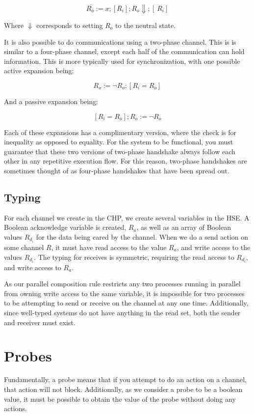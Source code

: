 \documentclass[times, 10pt]{article}
\begin{document}
\[
R_o := x; [R_i]; R_o\!\Downarrow; [~R_i]
\]

Where $\Downarrow$ corresponds to setting $R_o$ to the neutral state.

It is also possible to do communications using a two-phase channel.  This is is similar to a four-phase channel, except each half of the communication can hold information.  This is more typically used for synchronization, with one possible active expansion being:

\[
R_o := \lnot R_o; [R_i = R_o]
\]

And a passive expansion being:

\[
[R_i = R_o]; R_o := \lnot R_o
\]

Each of these expansions has a complimentary version, where the check is for inequality as opposed to equality. For the system to be functional, you must guarantee that these two versions of two-phase handshake always follow each other in any repetitive execution flow. For this reason, two-phase handshakes are sometimes thought of as four-phase handshakes that have been spread out.

\subsection{Typing}

For each channel we create in the CHP, we create several variables in the HSE.  A Boolean acknowledge variable is created, $R_a$, as well as an array of Boolean values $R_{d_i}$ for the data being cared by the channel.  When we do a send action on some channel $R$, it must have read access to the value $R_a$, and write access to the values $R_{d_i}$.  The typing for receives is symmetric, requiring the read access to $R_{d_i}$, and write access to $R_a$.  

As our parallel composition rule restricts any two processes running in parallel from owning write access to the same variable, it is impossible for two processes to be attempting to send or receive on the channel at any one time. Additionally, since well-typed systems do not have anything in the read set, both the sender and receiver must exist.

\section{Probes}

Fundamentally, a probe means that if you attempt to do an action on a channel, that action will not block. Additionally, as we consider a probe to be a boolean value, it must be possible to obtain the value of the probe without doing any actions. 
\end{document}

